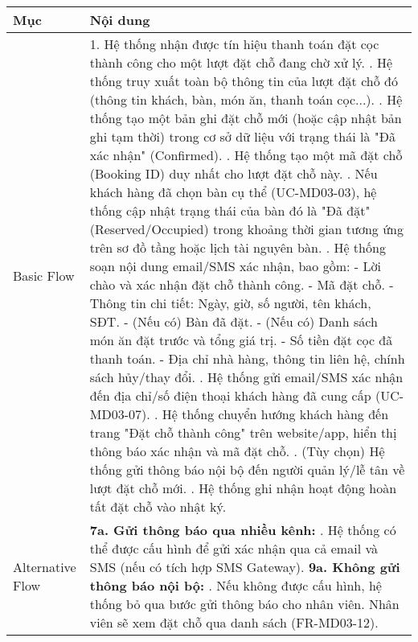 \begin{longtable}{|m{4cm}|p{11cm}|}
\hline
\textbf{Mục} & \textbf{Nội dung} \\
\hline
Basic Flow & 1. Hệ thống nhận được tín hiệu thanh toán đặt cọc thành công cho một lượt đặt chỗ đang chờ xử lý. \newline 2. Hệ thống truy xuất toàn bộ thông tin của lượt đặt chỗ đó (thông tin khách, bàn, món ăn, thanh toán cọc...). \newline 3. Hệ thống tạo một bản ghi đặt chỗ mới (hoặc cập nhật bản ghi tạm thời) trong cơ sở dữ liệu với trạng thái là "Đã xác nhận" (Confirmed). \newline 4. Hệ thống tạo một mã đặt chỗ (Booking ID) duy nhất cho lượt đặt chỗ này. \newline 5. Nếu khách hàng đã chọn bàn cụ thể (UC-MD03-03), hệ thống cập nhật trạng thái của bàn đó là "Đã đặt" (Reserved/Occupied) trong khoảng thời gian tương ứng trên sơ đồ tầng hoặc lịch tài nguyên bàn. \newline 6. Hệ thống soạn nội dung email/SMS xác nhận, bao gồm: \newline    - Lời chào và xác nhận đặt chỗ thành công. \newline    - Mã đặt chỗ. \newline    - Thông tin chi tiết: Ngày, giờ, số người, tên khách, SĐT. \newline    - (Nếu có) Bàn đã đặt. \newline    - (Nếu có) Danh sách món ăn đặt trước và tổng giá trị. \newline    - Số tiền đặt cọc đã thanh toán. \newline    - Địa chỉ nhà hàng, thông tin liên hệ, chính sách hủy/thay đổi. \newline 7. Hệ thống gửi email/SMS xác nhận đến địa chỉ/số điện thoại khách hàng đã cung cấp (UC-MD03-07). \newline 8. Hệ thống chuyển hướng khách hàng đến trang "Đặt chỗ thành công" trên website/app, hiển thị thông báo xác nhận và mã đặt chỗ. \newline 9. (Tùy chọn) Hệ thống gửi thông báo nội bộ đến người quản lý/lễ tân về lượt đặt chỗ mới. \newline 10. Hệ thống ghi nhận hoạt động hoàn tất đặt chỗ vào nhật ký. \\
\hline
Alternative Flow & \textbf{7a. Gửi thông báo qua nhiều kênh:} \newline    1. Hệ thống có thể được cấu hình để gửi xác nhận qua cả email và SMS (nếu có tích hợp SMS Gateway). \newline \textbf{9a. Không gửi thông báo nội bộ:} \newline    1. Nếu không được cấu hình, hệ thống bỏ qua bước gửi thông báo cho nhân viên. Nhân viên sẽ xem đặt chỗ qua danh sách (FR-MD03-12). \\

\end{longtable}
